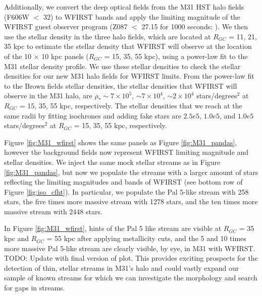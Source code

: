 \documentclass[twocolumn]{aastex62}
\newcommand{\todo}[1]{{\color{red} TODO: #1}}
\begin{document}
Additionally, we convert the deep optical fields from the \citet{brown09} M31 HST halo fields (F606W $<$ 32) to WFIRST bands and apply the limiting magnitude of the WFIRST guest observer program (Z087 $<$ 27.15 for 1000 seconds: \citealt{spergel13}). We then use the stellar density in the three \citet{brown09} halo fields, which are located at $R_{GC}$ = 11, 21, 35 kpc to estimate the stellar density that WFIRST will observe at the location of the 10 $\times$ 10 kpc panels ($R_{GC}$ = 15, 35, 55 kpc), using a power-law fit to the M31 stellar density profile. We use these stellar densities to check the stellar densities for our new M31 halo fields for WFIRST limits. From the power-law fit to the Brown fields stellar densities, the stellar densities that WFIRST will observe in the M31 halo, are $\rho_*  \sim 7 \times 10^5$,  ${\sim}7 \times 10^4$,  ${\sim} 2 \times 10^4$ stars/degrees$^2$ at  $R_{GC}$ = 15, 35, 55 kpc, respectively. The stellar densities that we reach at the same radii by fitting isochrones and adding fake stars are  $2.5e5$, $1.0e5$, and $1.0e5$ stars/degrees$^2$ at  $R_{GC}$ = 15, 35, 55 kpc, respectively.

Figure \ref{fig:M31_wfirst} shows the same panels as Figure \ref{fig:M31_pandas}, however the background fields now represent WFIRST limiting magnitude and stellar densities. We inject the same mock stellar streams as in Figure \ref{fig:M31_pandas}, but now we populate the streams with a larger amount of stars reflecting the limiting magnitudes and bands of WFIRST (see bottom row of Figure \ref{fig:iso_cfht}). In particular, we populate the Pal 5-like stream with 258 stars, the five times more massive stream with 1278 stars, and the ten times more massive stream with 2448 stars.

In Figure \ref{fig:M31_wfirst},  hints of the Pal 5 like stream are visible at $R_{GC}$ = 35 kpc and $R_{GC}$ = 55 kpc after applying metallicity cuts, and the 5 and 10 times more massive Pal 5-like stream are clearly visible, by eye, in M31 with WFIRST.\todo{Update with final version of plot.} %
This provides exciting prospects for the detection of thin, stellar streams in M31's halo and could vastly expand our sample of known streams for which we can investigate the morphology and search for gaps in streams. 
\end{document}
